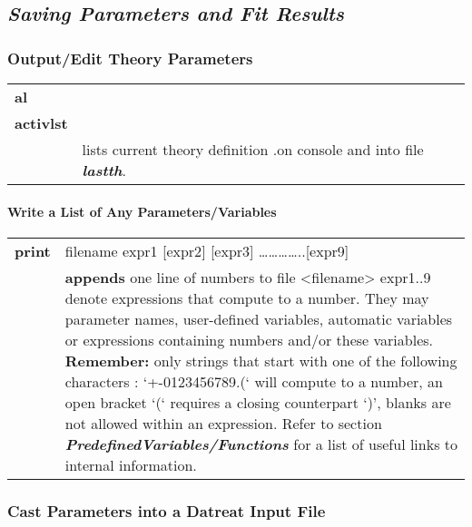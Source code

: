 \documentclass[]{article}
\let\oldparagraph\paragraph
\renewcommand{\paragraph}[1]{\oldparagraph{#1}\mbox{}}
\begin{document}
\hypertarget{saving-parameters-and-fit-results}{%
\subsection{\texorpdfstring{\emph{Saving Parameters and Fit Results
}}{Saving Parameters and Fit Results }}\label{saving-parameters-and-fit-results}}

\hypertarget{outputedit-theory-parameters}{%
\subsubsection{Output/Edit Theory
Parameters}\label{outputedit-theory-parameters}}

\begin{longtable}[]{@{}ll@{}}
\toprule
\endhead
\textbf{al} &\tabularnewline
\textbf{activlst} &\tabularnewline
& lists current theory definition .on console and into file
\emph{\textbf{lastth}}.\tabularnewline
\bottomrule
\end{longtable}

\hypertarget{write-a-list-of-any-parametersvariables}{%
\paragraph{Write a List of Any
Parameters/Variables}\label{write-a-list-of-any-parametersvariables}}

\begin{longtable}[]{@{}ll@{}}
\toprule
\endhead
\textbf{print} & filename expr1 {[}expr2{]} {[}expr3{]}
\ldots{}\ldots{}\ldots{}\ldots{}..{[}expr9{]}\tabularnewline
& \textbf{appends} one line of numbers to file
\textless{}filename\textgreater{} expr1..9 denote expressions that
compute to a number. They may parameter names, user-defined variables,
automatic variables or expressions containing numbers and/or these
variables. \textbf{Remember:} only strings that start with one of the
following characters : `+-0123456789.(` will compute to a number, an
open bracket `(` requires a closing counterpart `)', blanks are not
allowed within an expression. Refer to section
\emph{\textbf{PredefinedVariables/Functions}} for a list of useful links
to internal information.\tabularnewline
\bottomrule
\end{longtable}

\hypertarget{cast-parameters-into-a-datreat-input-file}{%
\subsubsection{Cast Parameters into a Datreat Input
File}\label{cast-parameters-into-a-datreat-input-file}}
\end{document}
